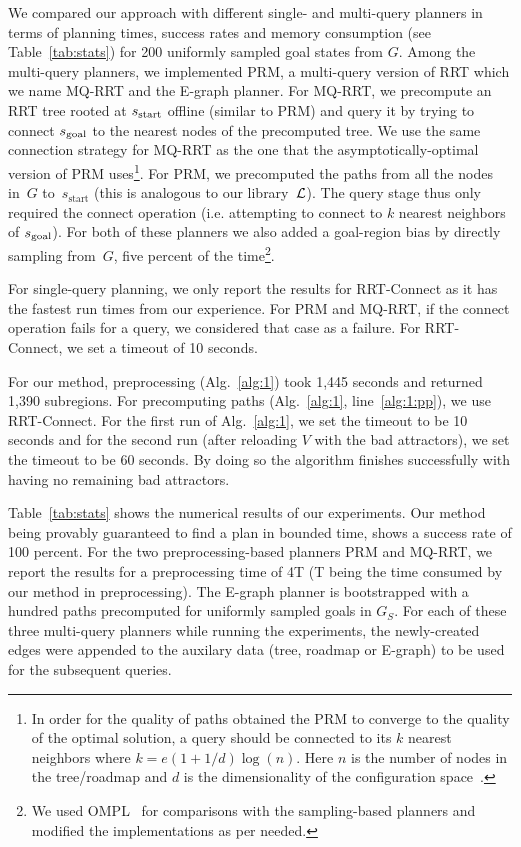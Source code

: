 \documentclass[a4paper,10pt]{article}
\begin{document}
We compared our approach with different single- and multi-query planners in terms of planning times, success rates and memory consumption (see Table~\ref{tab:stats}) for 200 uniformly sampled goal states from $G$. Among the multi-query planners, we implemented PRM, a multi-query version of RRT which we name MQ-RRT and the E-graph planner. 
For MQ-RRT, we precompute an RRT tree rooted at  $s_{\textrm{start}}$ offline (similar to PRM) and query it by trying to connect $s_{\text{goal}}$ to the nearest nodes of the precomputed tree. We use the same connection strategy for MQ-RRT as the one that the asymptotically-optimal version of PRM uses\footnote{In order for the quality of paths obtained the PRM to converge to the quality of the optimal solution, a query should be connected to its $k$ nearest neighbors where 
$k = e(1+1/d)\log(n)$.
Here $n$ is the number of nodes in the tree/roadmap and $d$ is the dimensionality of the configuration space~\cite{karaman2011sampling,SSH16}. 
}.
For PRM, we precomputed the paths from all the nodes in~$G$ to~$s_{\text{start}}$ (this is analogous to our library~$\mathcal{L}$). 
The query stage thus only required the connect operation (i.e. attempting to connect to $k$ nearest neighbors of $s_{\text{goal}}$). For both of these planners we also added a goal-region bias by directly sampling from~$G$, five percent of the time\footnote{We used OMPL~\cite{SMK12} for comparisons with the sampling-based planners and modified the implementations as per needed.}. 

For single-query planning, we only report the results for RRT-Connect as it has the fastest run times from our experience. For PRM and MQ-RRT, if the connect operation fails for a query, we considered that case as a failure. For RRT-Connect, we set a timeout of 10 seconds.

For our method, preprocessing (Alg.~\ref{alg:1}) took 1,445 seconds and returned 1,390 subregions. For precomputing paths (Alg.~\ref{alg:1}, line~\ref{alg:1:pp}), we use RRT-Connect. For the first run of Alg.~\ref{alg:1}, we set the timeout to be 10 seconds and for the second run (after reloading $V$ with the bad attractors), we set the timeout to be 60 seconds. By doing so the algorithm finishes successfully with having no remaining bad attractors.

Table~\ref{tab:stats} shows the numerical results of our experiments. Our method being provably guaranteed to find a plan in bounded time, shows a success rate of 100 percent. For the two preprocessing-based planners PRM and MQ-RRT, we report the results for a preprocessing time of 4T (T being the time consumed by our method in preprocessing). The E-graph planner is bootstrapped with a hundred paths precomputed for uniformly sampled goals in $G_S$. For each of these three multi-query planners while running the experiments, the newly-created edges were appended to the auxilary data (tree, roadmap or E-graph) to be used for the subsequent queries.
\end{document}
